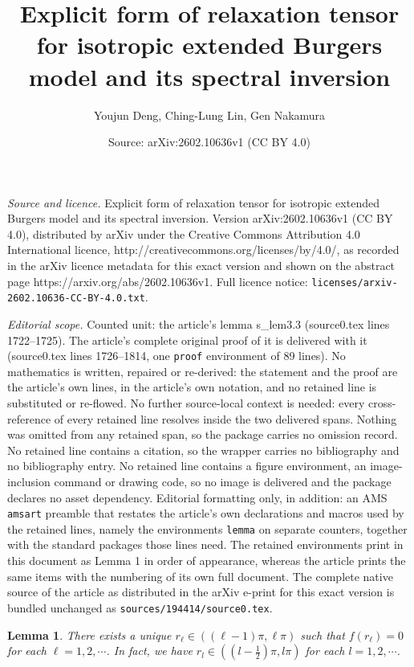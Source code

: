 \documentclass[10pt,a4paper]{amsart}
\title{Explicit form of relaxation tensor for isotropic extended Burgers model and its spectral inversion}
\author{Youjun Deng, Ching-Lung Lin, Gen Nakamura}
\date{Source: arXiv:2602.10636v1 (CC BY 4.0)}
\newtheorem{lemma}{Lemma}
\begin{document}
\maketitle

\noindent\emph{Source and licence.} Explicit form of relaxation tensor for isotropic extended Burgers model and its spectral inversion. Version arXiv:2602.10636v1 (CC BY 4.0), distributed by arXiv under the Creative Commons Attribution 4.0 International licence, http://creativecommons.org/licenses/by/4.0/, as recorded in the arXiv licence metadata for this exact version and shown on the abstract page https://arxiv.org/abs/2602.10636v1. Full licence notice: \texttt{licenses/arxiv-2602.10636-CC-BY-4.0.txt}.\par\smallskip

\noindent\textit{Editorial scope.} Counted unit: the article's lemma s\_lem3.3 (source0.tex lines 1722--1725). The article's complete original proof of it is delivered with it (source0.tex lines 1726--1814, one \texttt{proof} environment of 89 lines). No mathematics is written, repaired or re-derived: the statement and the proof are the article's own lines, in the article's own notation, and no retained line is substituted or re-flowed.  No further source-local context is needed: every cross-reference of every retained line resolves inside the two delivered spans.  Nothing was omitted from any retained span, so the package carries no omission record.  No retained line contains a citation, so the wrapper carries no bibliography and no bibliography entry.  No retained line contains a figure environment, an image-inclusion command or drawing code, so no image is delivered and the package declares no asset dependency.  Editorial formatting only, in addition: an AMS \texttt{amsart} preamble that restates the article's own declarations and macros used by the retained lines, namely the environments \texttt{lemma} on separate counters, together with the standard packages those lines need.  The retained environments print in this document as Lemma 1 in order of appearance, whereas the article prints the same items with the numbering of its own full document.  The complete native source of the article as distributed in the arXiv e-print for this exact version is bundled unchanged as \texttt{sources/194414/source0.tex}.
\begin{lemma}\label{s_lem3.3}
There exists a unique $r_\ell\in((\ell-1)\pi, \ell \pi)$ such that $f(r_\ell)=0$ for each  $\ell=1,2,\cdots$. In fact, we have
$r_l\in((l-\frac{1}{2})\pi, l\pi)$ for each  $l=1,2,\cdots$. 
\end{lemma}
\end{document}
